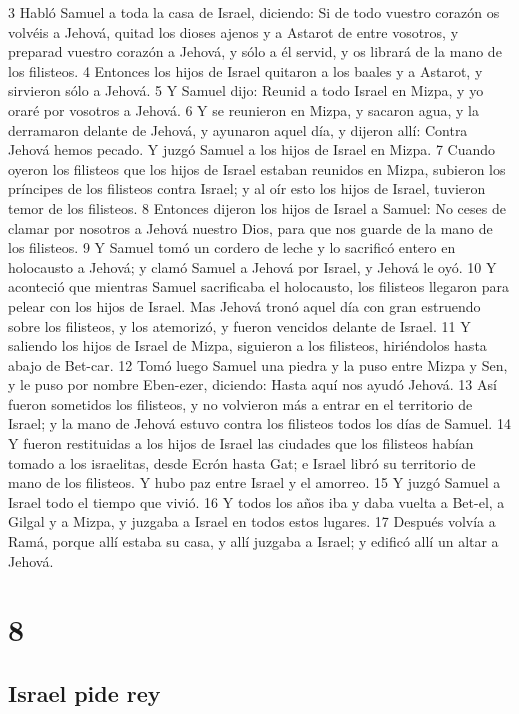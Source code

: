 3 Habló Samuel a toda la casa de Israel, diciendo: Si de todo vuestro corazón os volvéis a Jehová, quitad los dioses ajenos y a Astarot de entre vosotros, y preparad vuestro corazón a Jehová, y sólo a él servid, y os librará de la mano de los filisteos.
4 Entonces los hijos de Israel quitaron a los baales y a Astarot, y sirvieron sólo a Jehová.
5 Y Samuel dijo: Reunid a todo Israel en Mizpa, y yo oraré por vosotros a Jehová.
6 Y se reunieron en Mizpa, y sacaron agua, y la derramaron delante de Jehová, y ayunaron aquel día, y dijeron allí: Contra Jehová hemos pecado. Y juzgó Samuel a los hijos de Israel en Mizpa.
7 Cuando oyeron los filisteos que los hijos de Israel estaban reunidos en Mizpa, subieron los príncipes de los filisteos contra Israel; y al oír esto los hijos de Israel, tuvieron temor de los filisteos.
8 Entonces dijeron los hijos de Israel a Samuel: No ceses de clamar por nosotros a Jehová nuestro Dios, para que nos guarde de la mano de los filisteos.
9 Y Samuel tomó un cordero de leche y lo sacrificó entero en holocausto a Jehová; y clamó Samuel a Jehová por Israel, y Jehová le oyó.
10 Y aconteció que mientras Samuel sacrificaba el holocausto, los filisteos llegaron para pelear con los hijos de Israel. Mas Jehová tronó aquel día con gran estruendo sobre los filisteos, y los atemorizó, y fueron vencidos delante de Israel.
11 Y saliendo los hijos de Israel de Mizpa, siguieron a los filisteos, hiriéndolos hasta abajo de Bet-car.
12 Tomó luego Samuel una piedra y la puso entre Mizpa y Sen, y le puso por nombre Eben-ezer, diciendo: Hasta aquí nos ayudó Jehová. 
13 Así fueron sometidos los filisteos, y no volvieron más a entrar en el territorio de Israel; y la mano de Jehová estuvo contra los filisteos todos los días de Samuel.
14 Y fueron restituidas a los hijos de Israel las ciudades que los filisteos habían tomado a los israelitas, desde Ecrón hasta Gat; e Israel libró su territorio de mano de los filisteos. Y hubo paz entre Israel y el amorreo.
15 Y juzgó Samuel a Israel todo el tiempo que vivió.
16 Y todos los años iba y daba vuelta a Bet-el, a Gilgal y a Mizpa, y juzgaba a Israel en todos estos lugares.
17 Después volvía a Ramá, porque allí estaba su casa, y allí juzgaba a Israel; y edificó allí un altar a Jehová.

\chapter{8}

\section*{Israel pide rey}

